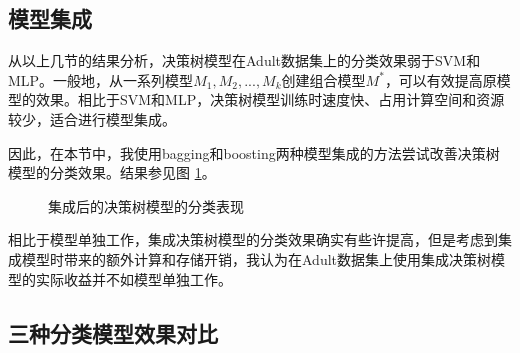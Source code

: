 \documentclass[12pt,a4paper]{article}
\theoremstyle{definition}
\begin{document}
\subsection{模型集成}

从以上几节的结果分析，决策树模型在Adult数据集上的分类效果弱于SVM和MLP。一般地，从一系列模型$M_1, M_2, ... , M_k$创建组合模型$M^*$，可以有效提高原模型的效果。相比于SVM和MLP，决策树模型训练时速度快、占用计算空间和资源较少，适合进行模型集成。

\vspace{0.01\linewidth}
因此，在本节中，我使用bagging和boosting两种模型集成的方法尝试改善决策树模型的分类效果。结果参见图 \ref{fig:model-plus}。

\begin{figure}[H]
	\centering
	\caption{集成后的决策树模型的分类表现}
	\label{fig:model-plus}
\end{figure}

相比于模型单独工作，集成决策树模型的分类效果确实有些许提高，但是考虑到集成模型时带来的额外计算和存储开销，我认为在Adult数据集上使用集成决策树模型的实际收益并不如模型单独工作。

\subsection{三种分类模型效果对比}
\label{sec:compare}
\end{document}
